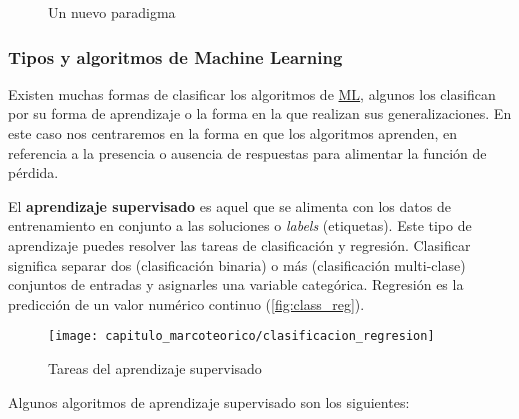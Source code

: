 \begin{figure}[H]
    
\caption{Un nuevo paradigma}\label{fig:paradigma}
\end{figure}

\subsubsection{Tipos y algoritmos de Machine Learning}

Existen muchas formas de clasificar los algoritmos de \hyperlink{abbr}{ML},
algunos los clasifican por su forma de aprendizaje o la forma en la que realizan
sus generalizaciones. En este caso nos centraremos en la forma en que los
algoritmos aprenden, en referencia a la presencia o ausencia de respuestas para
alimentar la función de pérdida\cite{AurelienGeron2017}.

El \textbf{aprendizaje supervisado} es aquel que se alimenta con los datos de
entrenamiento en conjunto a las soluciones o \emph{labels} (etiquetas). Este
tipo de aprendizaje puedes resolver las tareas de clasificación y regresión.
Clasificar significa separar dos (clasificación binaria) o más (clasificación
multi-clase) conjuntos de entradas y asignarles una variable categórica.
Regresión es la predicción de un valor numérico continuo
(\autoref{fig:class_reg}).

\begin{figure}[H]
    \centering
    \texttt{[image: capitulo\_marcoteorico/clasificacion\_regresion]}
    \caption{Tareas del aprendizaje supervisado}\label{fig:class_reg}
\end{figure}

Algunos algoritmos de aprendizaje supervisado son los siguientes:

